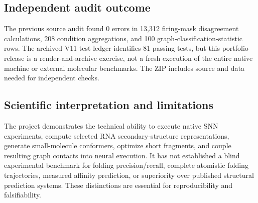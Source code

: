 \documentclass[11pt,a4paper]{article}
\begin{document}
\subsection{Independent audit outcome}
The previous source audit found 0 errors in 13,312 firing-mask disagreement calculations, 208 condition aggregations, and 100 graph-classification-statistic rows. The archived V11 test ledger identifies 81 passing tests, but this portfolio release is a render-and-archive exercise, not a fresh execution of the entire native machine or external molecular benchmarks. The ZIP includes source and data needed for independent checks.
\subsection{Scientific interpretation and limitations}
The project demonstrates the technical ability to execute native SNN experiments, compute selected RNA secondary-structure representations, generate small-molecule conformers, optimize short fragments, and couple resulting graph contacts into neural execution. It has not established a blind experimental benchmark for folding precision/recall, complete atomistic folding trajectories, measured affinity prediction, or superiority over published structural prediction systems. These distinctions are essential for reproducibility and falsifiability.
\end{document}
